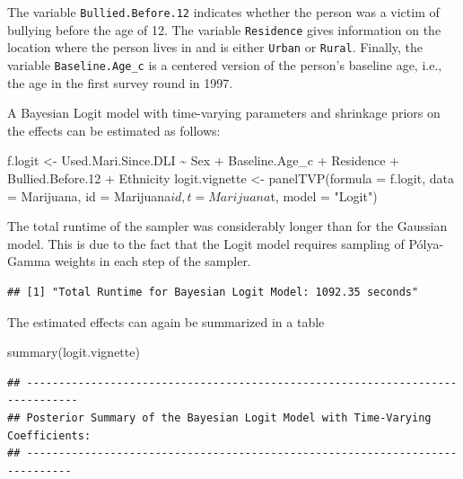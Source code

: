 \documentclass[a4paper, preprint, 3p,
authoryear]{elsarticle} %
\newenvironment{Shaded}{\begin{snugshade}}{\end{snugshade}}
\newcommand{\NormalTok}[1]{#1}
\begin{document}
The variable \texttt{Bullied.Before.12} indicates whether the person was
a victim of bullying before the age of 12. The variable
\texttt{Residence} gives information on the location where the person
lives in and is either \texttt{Urban} or \texttt{Rural}. Finally, the
variable \texttt{Baseline.Age\_c} is a centered version of the person's
baseline age, i.e., the age in the first survey round in 1997.

A Bayesian Logit model with time-varying parameters and shrinkage priors
on the effects can be estimated as follows:

\begin{Shaded}
\begin{Highlighting}[]
\NormalTok{f.logit \textless{}{-} Used.Mari.Since.DLI \textasciitilde{} Sex + Baseline.Age\_c + Residence + Bullied.Before.12 + Ethnicity}
\NormalTok{logit.vignette \textless{}{-} panelTVP(formula = f.logit,}
\NormalTok{                           data = Marijuana,}
\NormalTok{                           id = Marijuana$id,}
\NormalTok{                           t = Marijuana$t,}
\NormalTok{                           model = "Logit")}
\end{Highlighting}
\end{Shaded}

The total runtime of the sampler was considerably longer than for the
Gaussian model. This is due to the fact that the Logit model requires
sampling of Pólya-Gamma weights in each step of the sampler.

\begin{Shaded}
\end{Shaded}

\begin{verbatim}
## [1] "Total Runtime for Bayesian Logit Model: 1092.35 seconds"
\end{verbatim}

The estimated effects can again be summarized in a table

\begin{Shaded}
\begin{Highlighting}[]
\NormalTok{summary(logit.vignette)}
\end{Highlighting}
\end{Shaded}

\begin{verbatim}
## ------------------------------------------------------------------------------
## Posterior Summary of the Bayesian Logit Model with Time-Varying Coefficients:
## -----------------------------------------------------------------------------
\end{verbatim}
\end{document}
